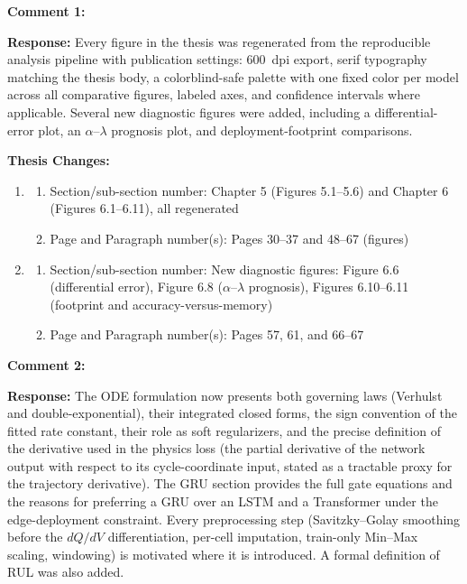 \documentclass[12pt,a4paper]{article}
\begin{document}
\textbf{Comment 1:} 

\vspace{\baselineskip}

\textbf{Response:} Every figure in the thesis was regenerated from the
reproducible analysis pipeline with publication settings: 600~dpi export, serif
typography matching the thesis body, a colorblind-safe palette with one fixed
color per model across all comparative figures, labeled axes, and confidence
intervals where applicable. Several new diagnostic figures were added,
including a differential-error plot, an $\alpha$--$\lambda$ prognosis plot, and
deployment-footprint comparisons.

\vspace{\baselineskip}

\textbf{Thesis Changes:}

\begin{enumerate}
    \item
    \begin{enumerate}
        \item Section/sub-section number: Chapter 5 (Figures 5.1--5.6) and Chapter 6 (Figures 6.1--6.11), all regenerated
        \item Page and Paragraph number(s): Pages 30--37 and 48--67 (figures)
    \end{enumerate}
    \item
    \begin{enumerate}
        \item Section/sub-section number: New diagnostic figures: Figure 6.6 (differential error), Figure 6.8 ($\alpha$--$\lambda$ prognosis), Figures 6.10--6.11 (footprint and accuracy-versus-memory)
        \item Page and Paragraph number(s): Pages 57, 61, and 66--67
    \end{enumerate}
\end{enumerate}

\vspace{\baselineskip}

\textbf{Comment 2:} 

\vspace{\baselineskip}

\textbf{Response:} The ODE formulation now presents both governing laws (Verhulst
and double-exponential), their integrated closed forms, the sign convention of
the fitted rate constant, their role as soft regularizers, and the precise
definition of the derivative used in the physics loss (the partial derivative of
the network output with respect to its cycle-coordinate input, stated as a
tractable proxy for the trajectory derivative). The GRU section provides the
full gate equations \cite{cho2014} and the reasons for preferring a GRU over an
LSTM and a Transformer under the edge-deployment constraint. Every
preprocessing step (Savitzky--Golay smoothing before the $dQ/dV$
differentiation, per-cell imputation, train-only Min--Max scaling, windowing)
is motivated where it is introduced. A formal definition of RUL was also added.
\end{document}
